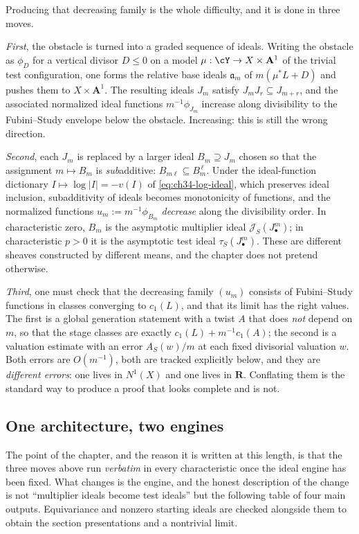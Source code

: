 Producing that decreasing family is the whole difficulty, and it is done in
three moves.

\emph{First}, the obstacle is turned into a graded sequence of ideals.
Writing the obstacle as $\phi_D$ for a vertical divisor $D\le0$ on a
model $\mu:\cY\to X\times\mathbf A^1$ of the trivial test configuration,
one forms the relative base ideals $\mathfrak a_m$ of $m(\mu^*L+D)$ and
pushes them to $X\times\mathbf A^1$.  The resulting ideals $J_m$ satisfy
$J_mJ_r\subseteq J_{m+r}$, and the associated normalized ideal functions
$m^{-1}\phi_{J_m}$ increase along divisibility to the Fubini--Study envelope below
the obstacle.  Increasing: this is still the wrong direction.

\emph{Second}, each $J_m$ is replaced by a larger ideal
$B_m\supseteq J_m$ chosen so that the assignment $m\mapsto B_m$ is
\emph{sub}additive:
$B_{m\ell}\subseteq B_m^{\,\ell}$.  Under the ideal-function dictionary
$I\mapsto\log|I|=-v(I)$ of \eqref{eq:ch34-log-ideal}, which preserves
ideal inclusion, subadditivity of ideals becomes monotonicity of functions, and the normalized functions
$u_m:=m^{-1}\phi_{B_m}$ \emph{decrease} along the divisibility order.  In
characteristic zero, $B_m$ is the asymptotic multiplier ideal
$\mathcal J_S(J_\bullet^m)$; in characteristic $p>0$ it is the
asymptotic test ideal $\tau_S(J_\bullet^m)$.  These are different sheaves
constructed by different means, and the chapter does not pretend otherwise.

\emph{Third}, one must check that the decreasing family
$(u_m)$ consists of Fubini--Study functions in classes converging to
$c_1(L)$, and that its limit has the right values.  The first is a global
generation statement with a twist $A$ that does \emph{not} depend on
$m$, so that the stage classes are exactly $c_1(L)+m^{-1}c_1(A)$; the
second is a valuation estimate with an error $A_S(w)/m$ at each fixed
divisorial valuation $w$.  Both errors are $O(m^{-1})$, both are
tracked explicitly below, and they are \emph{different errors}: one lives in
$N^1(X)$ and one lives in $\mathbf R$.  Conflating them is the standard
way to produce a proof that looks complete and is not.

\subsection{One architecture, two engines}
\label{sec:ch40-two-engines}

The point of the chapter, and the reason it is written at this length, is
that the three moves above run \emph{verbatim} in every characteristic once
the ideal engine has been fixed.  What changes is the engine, and the honest
description of the change is not ``multiplier ideals become test ideals'' but
the following table of four main outputs.  Equivariance and nonzero
starting ideals are checked alongside them to obtain the section
presentations and a nontrivial limit.

